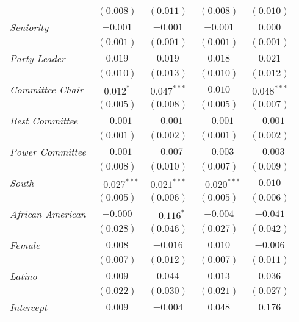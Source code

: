\documentclass[12pt]{article}
\begin{document}
\begin{table}
\begin{center}
\begin{tabular}{l c c c c }
			& $(0.008)$      & $(0.011)$      & $(0.008)$      & $(0.010)$      \\
			\textit{Seniority}                     & $-0.001$       & $-0.001$       & $-0.001$       & $0.000$        \\
			& $(0.001)$      & $(0.001)$      & $(0.001)$      & $(0.001)$      \\
			\textit{Party Leader}                       & $0.019$        & $0.019$        & $0.018$        & $0.021$        \\
			& $(0.010)$      & $(0.013)$      & $(0.010)$      & $(0.012)$      \\
			\textit{Committee Chair}                        & $0.012^{*}$    & $0.047^{***}$  & $0.010$        & $0.048^{***}$  \\
			& $(0.005)$      & $(0.008)$      & $(0.005)$      & $(0.007)$      \\
			\textit{Best Committee}               & $-0.001$       & $-0.001$       & $-0.001$       & $-0.001$       \\
			& $(0.001)$      & $(0.002)$      & $(0.001)$      & $(0.002)$      \\
			\textit{Power Committee}              & $-0.001$       & $-0.007$       & $-0.003$       & $-0.003$       \\
			& $(0.008)$      & $(0.010)$      & $(0.007)$      & $(0.009)$      \\
			\textit{South}                       & $-0.027^{***}$ & $0.021^{***}$  & $-0.020^{***}$ & $0.010$        \\
			& $(0.005)$      & $(0.006)$      & $(0.005)$      & $(0.006)$      \\
			\textit{African American}                          & $-0.000$       & $-0.116^{*}$   & $-0.004$       & $-0.041$       \\
			& $(0.028)$      & $(0.046)$      & $(0.027)$      & $(0.042)$      \\
			\textit{Female}                        & $0.008$        & $-0.016$       & $0.010$        & $-0.006$       \\
			& $(0.007)$      & $(0.012)$      & $(0.007)$      & $(0.011)$      \\
			\textit{Latino}                        & $0.009$        & $0.044$        & $0.013$        & $0.036$        \\
			& $(0.022)$      & $(0.030)$      & $(0.021)$      & $(0.027)$      \\
			\textit{Intercept}                   & $0.009$        & $-0.004$       & $0.048$        & $0.176$        \\

\end{tabular}
\end{center}
\end{table}
\end{document}
